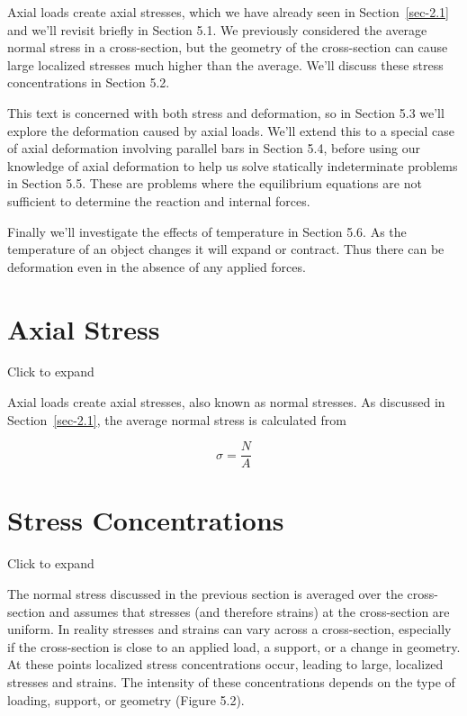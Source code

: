 \documentclass[
  letterpaper,
  DIV=11,
  numbers=noendperiod]{scrreprt}
\theoremstyle{definition}
\theoremstyle{remark}
\begin{document}
Axial loads create axial stresses, which we have already seen in
Section~\ref{sec-2.1} and we'll revisit briefly in Section 5.1. We
previously considered the average normal stress in a cross-section, but
the geometry of the cross-section can cause large localized stresses
much higher than the average. We'll discuss these stress concentrations
in Section 5.2.

This text is concerned with both stress and deformation, so in Section
5.3 we'll explore the deformation caused by axial loads. We'll extend
this to a special case of axial deformation involving parallel bars in
Section 5.4, before using our knowledge of axial deformation to help us
solve statically indeterminate problems in Section 5.5. These are
problems where the equilibrium equations are not sufficient to determine
the reaction and internal forces.

Finally we'll investigate the effects of temperature in Section 5.6. As
the temperature of an object changes it will expand or contract. Thus
there can be deformation even in the absence of any applied forces.

\section{Axial Stress}\label{sec-5.1}

Click to expand

Axial loads create axial stresses, also known as normal stresses. As
discussed in Section~\ref{sec-2.1}, the average normal stress is
calculated from

\[
\sigma=\frac{N}{A}\]

\section{Stress Concentrations}\label{sec-5.2}

Click to expand

The normal stress discussed in the previous section is averaged over the
cross-section and assumes that stresses (and therefore strains) at the
cross-section are uniform. In reality stresses and strains can vary
across a cross-section, especially if the cross-section is close to an
applied load, a support, or a change in geometry. At these points
localized stress concentrations occur, leading to large, localized
stresses and strains. The intensity of these concentrations depends on
the type of loading, support, or geometry (Figure 5.2).
\end{document}
